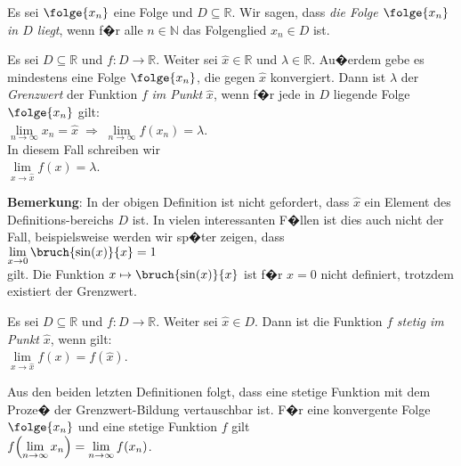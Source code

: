 Es sei $\folge{x_n}$ eine Folge und $D\subseteq \mathbb{R}$.  Wir sagen, dass 
\emph{die Folge $\folge{x_n}$ in $D$ liegt}, wenn f�r alle $n \in \mathbb{N}$ das Folgenglied $x_n
\in D$ ist.
\pagebreak

\begin{Definition}[Grenzwert]
  Es sei $D\subseteq \mathbb{R}$ und $f:D \rightarrow \mathbb{R}$.
  Weiter sei $\widehat{x} \in \mathbb{R}$ und  $\lambda\in \mathbb{R}$.  Au�erdem gebe es
  mindestens eine Folge $\folge{x_n}$, die gegen $\widehat{x}$ konvergiert.
  Dann ist $\lambda$ der \emph{Grenzwert} der Funktion $f$ \emph{im Punkt} $\widehat{x}$,
  wenn f�r jede in $D$ liegende Folge $\folge{x_n}$ gilt:
      \\[0.2cm]
      \hspace*{1.3cm}      
      $\lim\limits_{n\rightarrow\infty} x_n = \widehat{x} \;\Rightarrow\; \lim\limits_{n\rightarrow\infty} f(x_n) = \lambda$.
      \\[0.2cm]
      In diesem Fall schreiben wir 
      \\[0.2cm]
      \hspace*{1.3cm}      
      $\lim\limits_{x \rightarrow \widehat{x}} f(x) = \lambda$. 
      \eod
\end{Definition}

\noindent
\textbf{Bemerkung}:  In der obigen Definition ist nicht gefordert,
dass $\widehat{x}$ ein Element des Definitions-bereichs  $D$ ist.  In vielen interessanten F�llen
ist dies auch nicht der Fall, beispielsweise werden wir sp�ter zeigen, dass 
\\[0.2cm]
\hspace*{1.3cm}      
$\lim\limits_{x \rightarrow 0} \bruch{\sin(x)}{x} = 1$
\\[0.2cm]
gilt. Die Funktion $x \mapsto \bruch{\sin(x)}{x}$ ist f�r $x=0$ nicht definiert, trotzdem
existiert der Grenzwert.
\eox


\begin{Definition}[Stetigkeit]
  Es sei $D\subseteq \mathbb{R}$ und $f:D \rightarrow \mathbb{R}$.
  Weiter sei $\widehat{x}\in D$. Dann ist die Funktion $f$ \emph{stetig im Punkt} $\widehat{x}$,
  wenn gilt: \\[0.2cm]
  \hspace*{1.3cm}      
  $\lim\limits_{x\rightarrow \widehat{x}} f(x) = f(\widehat{x})$.  \eod
\end{Definition}

\noindent
Aus den beiden letzten Definitionen folgt, dass
eine stetige Funktion mit dem Proze� der Grenzwert-Bildung vertauschbar ist.  
F�r eine konvergente Folge $\folge{x_n}$ und eine stetige Funktion $f$ gilt 
      \\[0.2cm]
      \hspace*{1.3cm}      
      $f\Bigl(\lim\limits_{n\rightarrow\infty} x_n\Bigr) = \lim\limits_{n\rightarrow\infty} f(x_n)$.
\vspace*{0.3cm}

